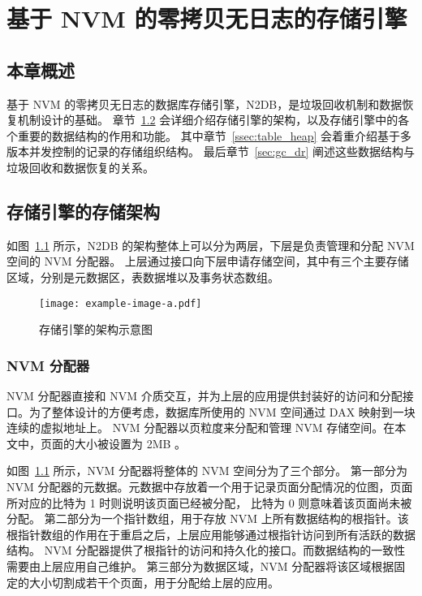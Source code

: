 
\chapter{基于 NVM 的零拷贝无日志的存储引擎}

\section{本章概述}
基于 NVM 的零拷贝无日志的数据库存储引擎，N2DB，是垃圾回收机制和数据恢复机制设计的基础。
章节~\ref{sec:storage_data_structure} 会详细介绍存储引擎的架构，以及存储引擎中的各个重要的数据结构的作用和功能。
其中章节~\ref{ssec:table_heap} 会着重介绍基于多版本并发控制的记录的存储组织结构。
最后章节~\ref{sec:gc_dr} 阐述这些数据结构与垃圾回收和数据恢复的关系。


\section{存储引擎的存储架构}
\label{sec:storage_data_structure}

如图~\ref{fig:n2db} 所示，N2DB 的架构整体上可以分为两层，下层是负责管理和分配 NVM 空间的 NVM 分配器。
上层通过接口向下层申请存储空间，其中有三个主要存储区域，分别是元数据区，表数据堆以及事务状态数组。

\begin{figure}
    \centering
    \texttt{[image: example-image-a.pdf]}
    \caption{存储引擎的架构示意图}
    \label{fig:n2db}
\end{figure}

\subsection{NVM 分配器}
NVM 分配器直接和 NVM 介质交互，并为上层的应用提供封装好的访问和分配接口。为了整体设计的方便考虑，数据库所使用的 NVM 空间通过 DAX 映射到一块连续的虚拟地址上。
NVM 分配器以页粒度来分配和管理 NVM 存储空间。在本文中，页面的大小被设置为 2MB 。

如图~\ref{fig:n2db} 所示，NVM 分配器将整体的 NVM 空间分为了三个部分。
第一部分为 NVM 分配器的元数据。元数据中存放着一个用于记录页面分配情况的位图，页面所对应的比特为 1 时则说明该页面已经被分配，
比特为 0 则意味着该页面尚未被分配。
第二部分为一个指针数组，用于存放 NVM 上所有数据结构的根指针。该根指针数组的作用在于重启之后，上层应用能够通过根指针访问到所有活跃的数据结构。
NVM 分配器提供了根指针的访问和持久化的接口。而数据结构的一致性需要由上层应用自己维护。
第三部分为数据区域，NVM 分配器将该区域根据固定的大小切割成若干个页面，用于分配给上层的应用。


